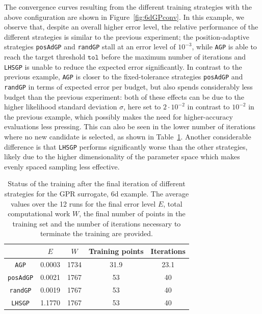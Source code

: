The convergence curves resulting from the different training strategies with the above configuration are shown in Figure~\ref{fig:6dGPconv}.
In this example, we observe that, despite an overall higher error level, the relative performance of the different strategies is similar to the previous experiment; the position-adaptive strategies \texttt{posAdGP} and \texttt{randGP} stall at an error level of $10^{-3}$, while \texttt{AGP} is able to reach the target threshold $\texttt{tol}$ before the maximum number of iterations and \texttt{LHSGP} is unable to reduce the expected error significantly.
In contrast to the previous example, \texttt{AGP} is closer to the fixed-tolerance strategies \texttt{posAdGP} and \texttt{randGP} in terms of expected error per budget, but also spends considerably less budget than the previous experiment: both of these effects can be due to the higher likelihood standard deviation $\sigma$, here set to $2\cdot 10^{-2}$ in contrast to $10^{-2}$ in the previous example, which possibly makes the need for higher-accuracy evaluations less pressing.
This can also be seen in the lower number of iterations where no new candidate is selected, as shown in Table~\ref{tab:6dGP-recap}.
Another considerable difference is that \texttt{LHSGP} performs significantly worse than the other strategies, likely due to the higher dimensionality of the parameter space which makes evenly spaced sampling less effective.

\begin{table}[H]
    \begin{centering}
    \begin{tabular}{ccccc}
    \toprule
        & $E$   & $W$ & Training points    & Iterations \\ 
        \midrule
        \texttt{AGP}  
        & 0.0003 & 1734 & 31.9  &  23.1   \\
        \texttt{posAdGP}
        & 0.0021 & 1767 & 53    & 40   \\
        \texttt{randGP}
        & 0.0019 & 1767 & 53    & 40 \\
        \texttt{LHSGP}
        & 1.1770 & 1767 &  53   & 40   \\
    \bottomrule
    \end{tabular}
    \caption{Status of the training after the final iteration of different strategies for the GPR surrogate, 6d example. The average values over the 12 runs for the final error level $E$, total computational work $W$, the final number of points in the training set and the number of iterations necessary to terminate the training are provided.
    }
    \label{tab:6dGP-recap}
\end{centering}
\end{table}

